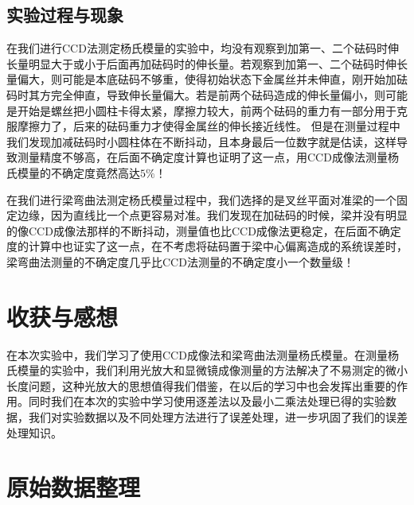 \documentclass[a4 paper,12pt]{article}
\begin{document}
\subsection{实验过程与现象}
在我们进行CCD法测定杨氏模量的实验中，均没有观察到加第一、二个砝码时伸长量明显大于或小于后面再加砝码时的伸长量。若观察到加第一、二个砝码时伸长量偏大，则可能是本底砝码不够重，使得初始状态下金属丝并未伸直，刚开始加砝码时其方完全伸直，导致伸长量偏大。若是前两个砝码造成的伸长量偏小，则可能是开始是螺丝把小圆柱卡得太紧，摩擦力较大，前两个砝码的重力有一部分用于克服摩擦力了，后来的砝码重力才使得金属丝的伸长接近线性。
但是在测量过程中我们发现加减砝码时小圆柱体在不断抖动，且本身最后一位数字就是估读，这样导致测量精度不够高，在后面不确定度计算也证明了这一点，用CCD成像法测量杨氏模量的不确定度竟然高达$5\%$！
\par 在我们进行梁弯曲法测定杨氏模量过程中，我们选择的是叉丝平面对准梁的一个固定边缘，因为直线比一个点更容易对准。我们发现在加砝码的时候，梁并没有明显的像CCD成像法那样的不断抖动，测量值也比CCD成像法更稳定，在后面不确定度的计算中也证实了这一点，在不考虑将砝码置于梁中心偏离造成的系统误差时，梁弯曲法测量的不确定度几乎比CCD法测量的不确定度小一个数量级！
\section{收获与感想}
在本次实验中，我们学习了使用CCD成像法和梁弯曲法测量杨氏模量。在测量杨氏模量的实验中，我们利用光放大和显微镜成像测量的方法解决了不易测定的微小长度问题，这种光放大的思想值得我们借鉴，在以后的学习中也会发挥出重要的作用。同时我们在本次的实验中学习使用逐差法以及最小二乘法处理已得的实验数据，我们对实验数据以及不同处理方法进行了误差处理，进一步巩固了我们的误差处理知识。
\section{原始数据整理}
\end{document}
